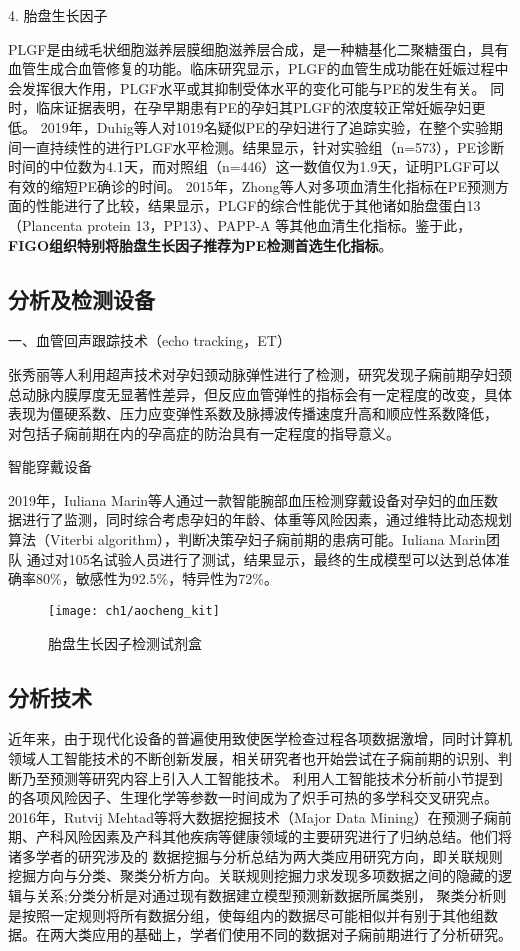 4. 胎盘生长因子

PLGF是由绒毛状细胞滋养层膜细胞滋养层合成，是一种糖基化二聚糖蛋白，具有血管生成合血管修复的功能。临床研究显示，PLGF的血管生成功能在妊娠过程中会发挥很大作用，PLGF水平或其抑制受体水平的变化可能与PE的发生有关\cite{Levine2004,Ahmad2004}。
同时，临床证据表明，在孕早期患有PE的孕妇其PLGF的浓度较正常妊娠孕妇更低\cite{Chau2017}。
2019年，Duhig等人\cite{Duhig2019}对1019名疑似PE的孕妇进行了追踪实验，在整个实验期间一直持续性的进行PLGF水平检测。结果显示，针对实验组（n=573），PE诊断时间的中位数为4.1天，而对照组（n=446）这一数值仅为1.9天，证明PLGF可以有效的缩短PE确诊的时间。
2015年，Zhong等人\cite{Zhong2015}对多项血清生化指标在PE预测方面的性能进行了比较，结果显示，PLGF的综合性能优于其他诸如胎盘蛋白13（Plancenta protein 13，PP13）、PAPP-A
等其他血清生化指标。鉴于此，\textbf{FIGO组织特别将胎盘生长因子推荐为PE检测首选生化指标}\cite{FIGO}。

\subsection{分析及检测设备}
一、血管回声跟踪技术（echo tracking，ET）

张秀丽等人\cite{Zhang2014}利用超声技术对孕妇颈动脉弹性进行了检测，研究发现子痫前期孕妇颈总动脉内膜厚度无显著性差异，但反应血管弹性的指标会有一定程度的改变，具体表现为僵硬系数、压力应变弹性系数及脉搏波传播速度升高和顺应性系数降低，
对包括子痫前期在内的孕高症的防治具有一定程度的指导意义。

智能穿戴设备

2019年，Iuliana Marin等人\cite{Marin2019}通过一款智能腕部血压检测穿戴设备对孕妇的血压数据进行了监测，同时综合考虑孕妇的年龄、体重等风险因素，通过维特比动态规划算法（Viterbi algorithm），判断决策孕妇子痫前期的患病可能。Iuliana Marin团队
通过对105名试验人员进行了测试，结果显示，最终的生成模型可以达到总体准确率80\%，敏感性为92.5\%，特异性为72\%。

\begin{figure}[htbp]
    \centering
    \texttt{[image: ch1/aocheng\_kit]}
    \caption{\label{fig:aocheng_kit}胎盘生长因子检测试剂盒}
\end{figure}

\subsection{分析技术}
近年来，由于现代化设备的普遍使用致使医学检查过程各项数据激增，同时计算机领域人工智能技术的不断创新发展，相关研究者也开始尝试在子痫前期的识别、判断乃至预测等研究内容上引入人工智能技术。
利用人工智能技术分析前小节提到的各项风险因子、生理化学等参数一时间成为了炽手可热的多学科交叉研究点。
2016年，Rutvij Mehtad等\cite{Mehta2016}将大数据挖掘技术（Major Data Mining）在预测子痫前期、产科风险因素及产科其他疾病等健康领域的主要研究进行了归纳总结。他们将诸多学者的研究涉及的
数据挖掘与分析总结为两大类应用研究方向，即关联规则挖掘方向与分类、聚类分析方向。关联规则挖掘力求发现多项数据之间的隐藏的逻辑与关系;分类分析是对通过现有数据建立模型预测新数据所属类别，
聚类分析则是按照一定规则将所有数据分组，使每组内的数据尽可能相似并有别于其他组数据\cite{Han2006}。在两大类应用的基础上，学者们使用不同的数据对子痫前期进行了分析研究。

